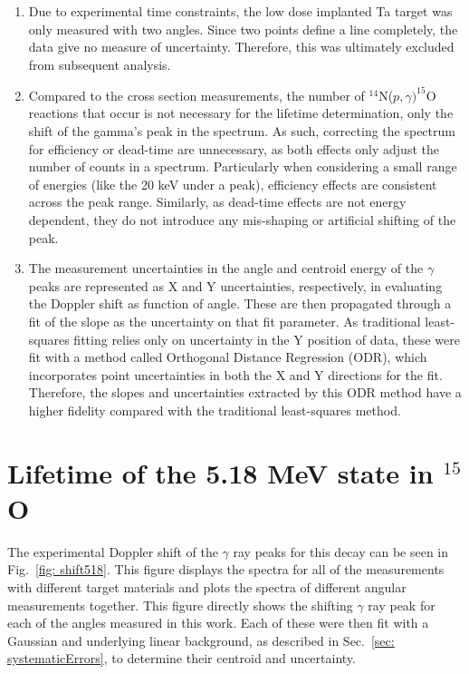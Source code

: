 \begin{enumerate}
\item Due to experimental time constraints, the low dose implanted Ta target was only measured with two angles. Since two points define a line completely, the data give no measure of uncertainty. Therefore, this was ultimately excluded from subsequent analysis.
\item Compared to the cross section measurements, the number of $^{14}$N($p,\gamma)^{15}$O reactions that occur is not necessary for the lifetime determination, only the shift of the gamma's peak in the spectrum. As such, correcting the spectrum for efficiency or dead-time are unnecessary, as both effects only adjust the number of counts in a spectrum. Particularly when considering a small range of energies (like the 20 keV under a peak), efficiency effects are consistent across the peak range. Similarly, as dead-time effects are not energy dependent, they do not introduce any mis-shaping or artificial shifting of the peak.
\item The measurement uncertainties in the angle and centroid energy of the $\gamma$ peaks are represented as X and Y uncertainties, respectively, in evaluating the Doppler shift as function of angle. These are then propagated through a fit of the slope as the uncertainty on that fit parameter. As traditional least-squares fitting relies only on uncertainty in the Y position of data, these were fit with a method called Orthogonal Distance Regression (ODR), which incorporates point uncertainties in both the X and Y directions for the fit. Therefore, the slopes and uncertainties extracted by this ODR method have a higher fidelity compared with the traditional least-squares method. 
\end{enumerate}

\section{Lifetime of the 5.18 MeV state in $^{15}$O}
\label{sec: lifetime518}

The experimental Doppler shift of the $\gamma$ ray peaks for this decay can be seen in Fig.\ \ref{fig: shift518}. This figure displays the spectra for all of the measurements with different target materials and plots the spectra of different angular measurements together. This figure directly shows the shifting $\gamma$ ray peak for each of the angles measured in this work. Each of these were then fit with a Gaussian and underlying linear background, as described in Sec.\ \ref{sec: systematicErrors}, to determine their centroid and uncertainty. 


